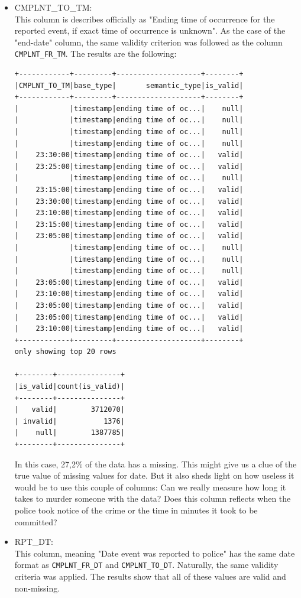 \documentclass{article}
\begin{document}
\begin{itemize}
\item CMPLNT\_TO\_TM: \\

This column is describes officially as "Ending time of occurrence for the reported event, if exact time of occurrence is unknown". As the case of the "end-date" column, the same validity criterion was followed as the column \texttt{CMPLNT\_FR\_TM}. The results are the following: 
\begin{verbatim}
+------------+---------+--------------------+--------+
|CMPLNT_TO_TM|base_type|       semantic_type|is_valid|
+------------+---------+--------------------+--------+
|            |timestamp|ending time of oc...|    null|
|            |timestamp|ending time of oc...|    null|
|            |timestamp|ending time of oc...|    null|
|            |timestamp|ending time of oc...|    null|
|    23:30:00|timestamp|ending time of oc...|   valid|
|    23:25:00|timestamp|ending time of oc...|   valid|
|            |timestamp|ending time of oc...|    null|
|    23:15:00|timestamp|ending time of oc...|   valid|
|    23:30:00|timestamp|ending time of oc...|   valid|
|    23:10:00|timestamp|ending time of oc...|   valid|
|    23:15:00|timestamp|ending time of oc...|   valid|
|    23:05:00|timestamp|ending time of oc...|   valid|
|            |timestamp|ending time of oc...|    null|
|            |timestamp|ending time of oc...|    null|
|            |timestamp|ending time of oc...|    null|
|    23:05:00|timestamp|ending time of oc...|   valid|
|    23:10:00|timestamp|ending time of oc...|   valid|
|    23:05:00|timestamp|ending time of oc...|   valid|
|    23:05:00|timestamp|ending time of oc...|   valid|
|    23:10:00|timestamp|ending time of oc...|   valid|
+------------+---------+--------------------+--------+
only showing top 20 rows

+--------+---------------+
|is_valid|count(is_valid)|
+--------+---------------+
|   valid|        3712070|
| invalid|           1376|
|    null|        1387785|
+--------+---------------+
\end{verbatim}

In this case, 27,2\% of the data has a missing. This might give us a clue of the true value of missing values for date. But it also sheds light on how useless it would be to use this couple of columns: Can we really measure how long it takes to murder someone with the data? Does this column reflects when the police took notice of the crime or the time in minutes it took to be committed? 

\item RPT\_DT: \\
This column, meaning "Date event was reported to police" has the same date format as \texttt{CMPLNT\_FR\_DT} and \texttt{CMPLNT\_TO\_DT}. Naturally, the same validity criteria was applied. The results show that all of these values are valid and non-missing. 


\end{itemize}
\end{document}
